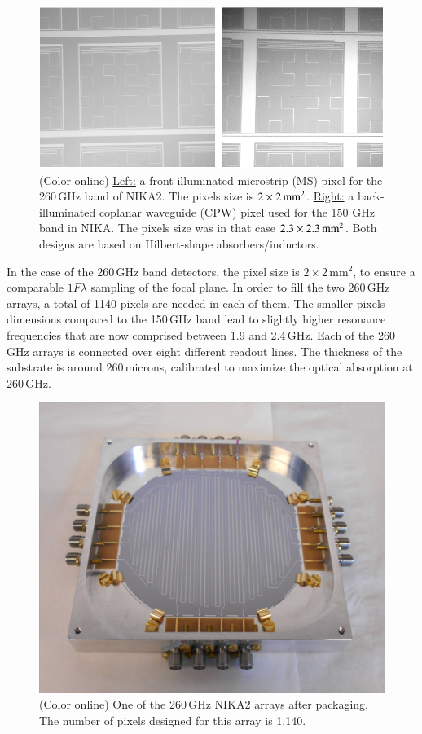 \documentclass[]{aa} %
\begin{document}
\begin{figure}[h]
   \centering
    \includegraphics[width=.95\linewidth]{CPWeMS.png}
      \caption{(Color online) \underline{Left:} a front-illuminated microstrip (MS) pixel for the 260\,GHz band of NIKA2. The pixels size is $2\times2\textrm{\,mm}^2$. \underline{Right:} a back-illuminated coplanar waveguide (CPW) pixel used for the 150 GHz band in NIKA. The pixels size was in that case $2.3\times2.3\textrm{\,mm}^2$. Both designs are based on Hilbert-shape absorbers/inductors.}
         \label{Pixels}
\end{figure}

In the case of the 260\,GHz band detectors, the pixel size is $2\times 2\mathrm{\,mm}^2$, to ensure a comparable $1 F \lambda$ sampling of the focal plane. In order to fill the two 260\,GHz arrays, a total of 1140 pixels are needed in each of them. The smaller pixels dimensions compared to the 150\,GHz band lead to slightly higher resonance frequencies that are now comprised between 1.9 and 2.4\,GHz. Each of the 260\,GHz arrays is connected over eight different readout lines. The thickness of the substrate is around 260\,microns, calibrated to maximize the optical absorption at 260\,GHz. 

\begin{figure}[h]
   \centering
    \includegraphics[width=.95\linewidth]{1mm_array.jpg}
      \caption{(Color online) One of the 260\,GHz NIKA2 arrays after packaging. The number of pixels designed for this array is 1,140.}
         \label{Array}
\end{figure}
\end{document}
